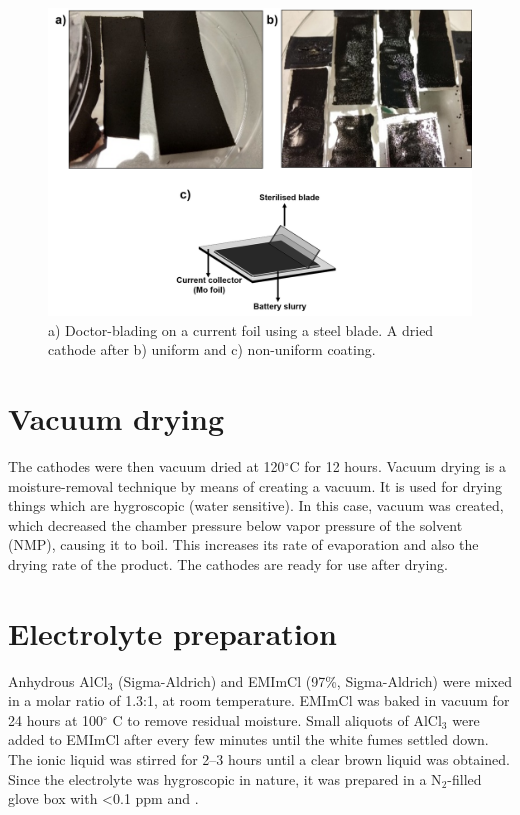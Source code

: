 \begin{figure}[tbh!]
\centering
\includegraphics[width=\textwidth]{Figures/chap3fig/coating}
\caption{a) Doctor-blading on a current foil using a steel blade. A dried cathode after b) uniform and c) non-uniform coating.}
\label{Figures/chap3fig:coating}
\end{figure}

\section{Vacuum drying} \label{vac}
The cathodes were then vacuum dried at 120$^{\circ}$C for 12 hours. Vacuum drying is a moisture-removal technique by means of creating a vacuum. It is used for drying things which are hygroscopic (water sensitive). In this case, vacuum was created, which decreased the chamber pressure below vapor pressure of the solvent (NMP), causing it to boil. This increases its rate of evaporation and also the drying rate of the product. The cathodes are ready for use after drying. 

\section{Electrolyte preparation}
Anhydrous AlCl$_3$ (Sigma-Aldrich) and EMImCl (97\%, Sigma-Aldrich) were mixed in a molar ratio of 1.3:1, at room temperature. EMImCl was baked in vacuum for 24 hours at 100$^{\circ}$ C to remove residual moisture. Small aliquots of AlCl$_3$ were added to EMImCl after every few minutes until the white fumes settled down. The ionic liquid was stirred for 2--3 hours until a clear brown liquid was obtained. Since the electrolyte was hygroscopic in nature, it was prepared in a N$_2$-filled glove box with <0.1 ppm  and . 

